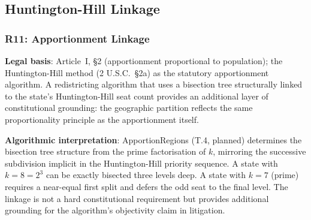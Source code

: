 \subsection{Huntington-Hill Linkage}

\subsubsection*{R11: Apportionment Linkage}

\textbf{Legal basis}: Article~I, \S2 (apportionment proportional to population);
the Huntington-Hill method (2 U.S.C.\ \S2a) as the statutory apportionment
algorithm.
A redistricting algorithm that uses a bisection tree structurally linked to the
state's Huntington-Hill seat count provides an additional layer of constitutional
grounding: the geographic partition reflects the same proportionality principle
as the apportionment itself.

\textbf{Algorithmic interpretation}: ApportionRegions (T.4, planned) determines
the bisection tree structure from the prime factorisation of $k$, mirroring the
successive subdivision implicit in the Huntington-Hill priority sequence.
A state with $k = 8 = 2^3$ can be exactly bisected three levels deep.
A state with $k = 7$ (prime) requires a near-equal first split and defers the
odd seat to the final level.
The linkage is not a hard constitutional requirement but provides additional
grounding for the algorithm's objectivity claim in litigation.
